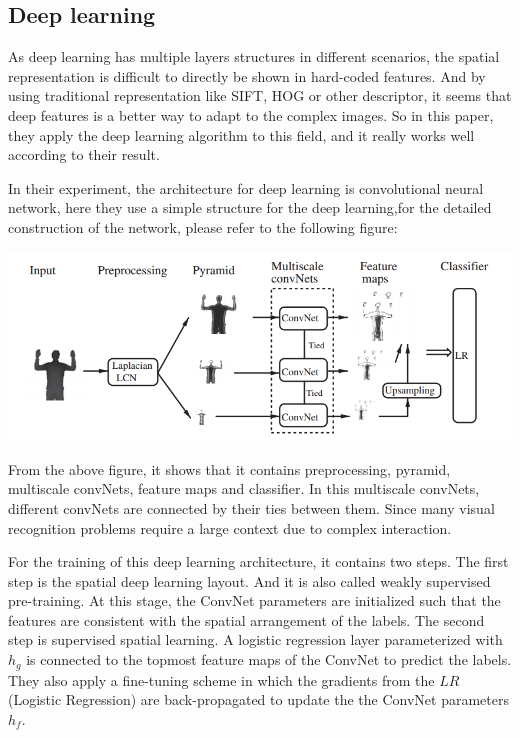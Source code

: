 \documentclass[pdftex,12pt,a4paper]{article}
\begin{document}
\subsection{Deep learning}
\indent As deep learning has multiple layers structures in different scenarios, the spatial representation is difficult to directly be shown in hard-coded features. And by using traditional representation like SIFT, HOG or other descriptor, it seems that deep features is a better way to adapt to the complex images. So in this paper, they apply the deep learning algorithm to this field, and it really works well according to their result.

In their experiment, the architecture for deep learning is convolutional neural network, here they use a simple structure for the deep learning,for the detailed construction of the network, please refer to the following figure:

\begin{center} %
\includegraphics[scale=0.4]{lit-rev3-2.png}
\end{center}

From the above figure, it shows that it contains preprocessing, pyramid, multiscale convNets, feature maps and classifier. In this multiscale convNets, different convNets are connected by their ties between them. Since many visual recognition problems require a large context due to complex interaction.

For the training of this deep learning architecture, it contains two steps. The first step is the spatial deep learning layout. And
it is also called weakly supervised pre-training. At this stage, the ConvNet parameters are initialized such that the features are consistent with the spatial arrangement of the labels. The second step is supervised spatial learning. A logistic regression layer parameterized with $h_{g}$ is connected to the topmost feature maps of the ConvNet to predict the labels. They also apply a fine-tuning scheme in which the gradients from the $LR$(Logistic Regression) are back-propagated to update the the ConvNet parameters $h_{f}$.
\end{document}
